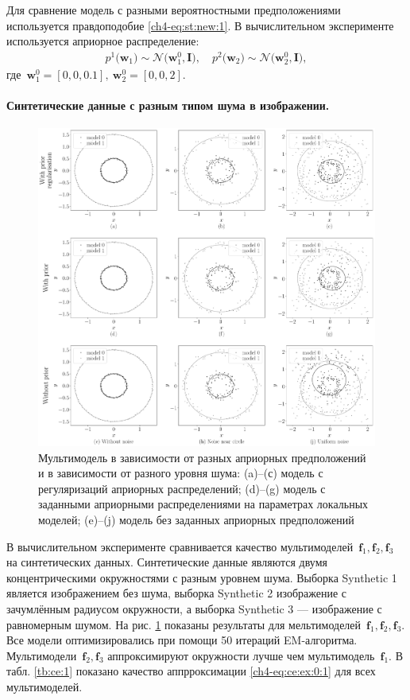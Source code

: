 Для сравнение модель с разными вероятностными предположениями используется правдоподобие  \eqref{ch4-eq:st:new:1}.
В вычислительном эксперименте используется априорное распределение:
\[
\label{ch4-eq:ce:1}
\begin{aligned}
p^{1}\bigr(\textbf{w}_1\bigr)\sim\mathcal{N}\bigr(\textbf{w}^{0}_{1}, \textbf{I}\bigr), \quad p^{2}\bigr(\textbf{w}_2\bigr)\sim\mathcal{N}\bigr(\textbf{w}^{0}_{2}, \textbf{I}\bigr),
\end{aligned}
\]
где~$\textbf{w}^{0}_1 = [0, 0, 0.1],\ \textbf{w}^{0}_2 = [0, 0, 2]$.

\paragraph{Синтетические данные с разным типом шума в изображении.}
\begin{figure}[!ht]\center
\includegraphics[width=1\textwidth]{results/priorexpert/experiment_synthetic}
\caption{Мультимодель в зависимости от разных априорных предположений и в зависимости от разного уровня шума: (a)--(с) модель с регуляризаций априорных распределений; (d)--(g) модель с заданными априорными распределениями на параметрах локальных моделей; (e)--(j) модель без заданных априорных предположений}
\label{ch4-experiment:1}
\end{figure}
В вычислительном эксперименте сравнивается качество мультимоделей~$\textbf{f}_1, \textbf{f}_2, \textbf{f}_3$ на синтетических данных.
Синтетические данные являются двумя концентрическими окружностями с разным уровнем шума.
Выборка Synthetic 1 является изображением без шума, выборка Synthetic 2 изображение с зачумлённым радиусом окружности, а выборка Synthetic 3 --- изображение с равномерным шумом.
На рис. \ref{ch4-experiment:1} показаны результаты для мельтимоделей~$\textbf{f}_1, \textbf{f}_2, \textbf{f}_3$.
Все модели оптимизировались при помощи 50 итераций EM-алгоритма.
Мультимодели~$\textbf{f}_2, \textbf{f}_3$ аппроксимируют окружности лучше чем мультимодель~$\textbf{f}_1$. В табл. \ref{tb:ce:1} показано качество аппрроксимации \eqref{ch4-eq:ce:ex:0:1} для всех мультимоделей.

